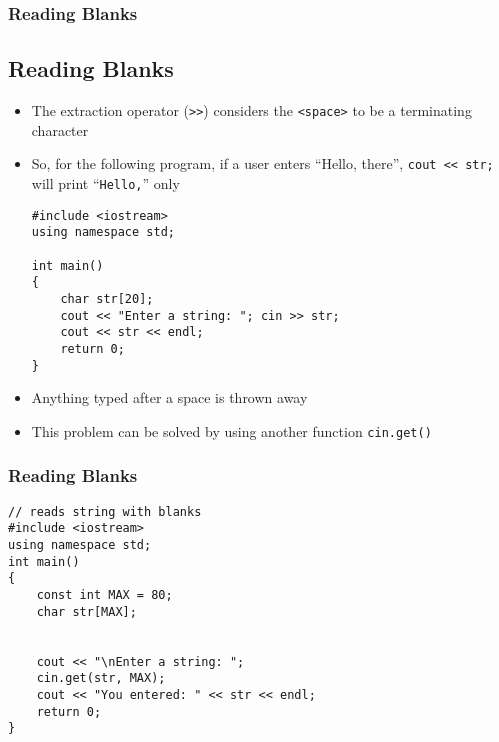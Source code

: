 \documentclass{beamer}
\begin{document}
\begin{frame}[fragile]\frametitle{Reading Blanks}
    \subsection{Reading Blanks} %
    \label{sub:reading_blanks}
    \begin{itemize}
        \item The extraction operator (\texttt{>>}) considers the \texttt{<space>} to be a terminating character
        \item So, for the following program, if a user enters ``Hello, there'', \texttt{cout << str;} will print ``\texttt{Hello,}'' only
        \lstset{style=mystyle}
\begin{lstlisting}
#include <iostream>
using namespace std;

int main()
{
    char str[20];
    cout << "Enter a string: "; cin >> str;
    cout << str << endl;
    return 0;
}
\end{lstlisting}
        \item Anything typed after a space is thrown away
        \item This problem can be solved by using another function \texttt{cin.get()}
    \end{itemize}
\end{frame}

\begin{frame}[fragile]\frametitle{Reading Blanks}
    \lstset{style=mystyle}
\begin{lstlisting}
// reads string with blanks
#include <iostream>
using namespace std;
int main()
{
    const int MAX = 80;
    char str[MAX];


    cout << "\nEnter a string: ";
    cin.get(str, MAX);
    cout << "You entered: " << str << endl;
    return 0;
}
\end{lstlisting}
\end{frame}
\end{document}
